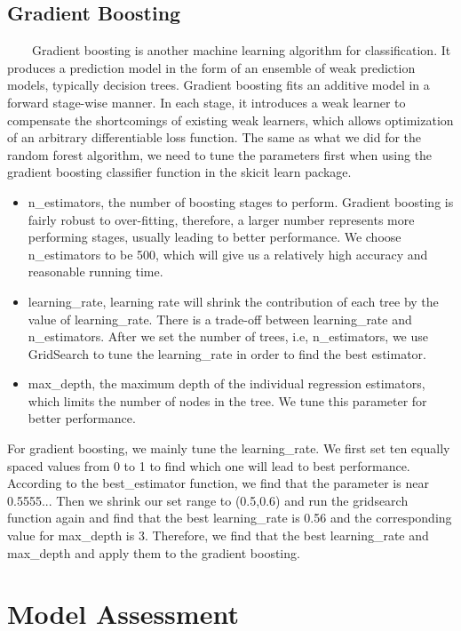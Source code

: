 \documentclass[11pt]{article}
\begin{document}
\subsection{Gradient Boosting}
\ \ \ \ Gradient boosting is another machine learning algorithm for classification. It produces a prediction model in the form of an ensemble of weak prediction models, typically decision trees. Gradient boosting fits an additive model in a forward stage-wise manner. In each stage, it introduces a weak learner to compensate the shortcomings of existing weak learners, which allows optimization of an arbitrary differentiable loss function\cite{gb}. The same as what we did for the random forest algorithm, we need to tune the parameters first when using the gradient boosting classifier function in the skicit learn package.
\begin{itemize}
\item n\_estimators, the number of boosting stages to perform. Gradient boosting is fairly robust to over-fitting, therefore, a larger number represents more performing stages, usually leading to better performance. We choose n\_estimators to be 500, which will give us a relatively high accuracy and reasonable running time.
\item learning\_rate, learning rate will shrink the contribution of each tree by the value of learning\_rate. There is a trade-off between learning\_rate and n\_estimators. After we set the number of trees, i.e, n\_estimators, we use GridSearch to tune the learning\_rate in order to find the best estimator.
\item max\_depth, the maximum depth of the individual regression estimators, which limits the number of nodes in the tree. We tune this parameter for better performance. 
\end{itemize}
\par 
For gradient boosting, we mainly tune the learning\_rate. We first set ten equally spaced values from 0 to 1 to find which one will lead to best performance. According to the best\_estimator function, we find that the parameter is near 0.5555... Then we shrink our set range to (0.5,0.6) and run the gridsearch function again and find that the best learning\_rate is 0.56 and the corresponding value for max\_depth is 3. Therefore, we find that the best learning\_rate and max\_depth and apply them to the gradient boosting.

\section{Model Assessment}
\end{document}
